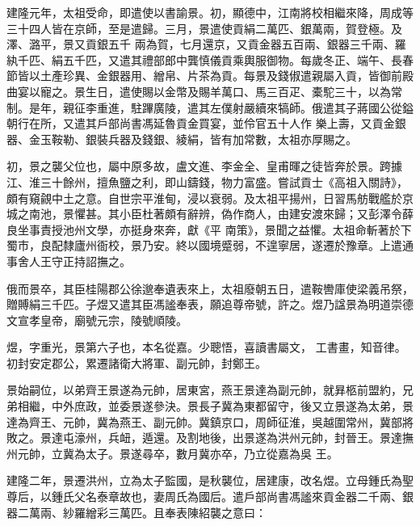 \begin{pinyinscope}
 建隆元年，太祖受命，即遣使以書諭景。初，顯德中，江南將校相繼來降，周成等三十四人皆在京師，至是遣歸。三月，景遣使貢絹二萬匹、銀萬兩，賀登極。及澤、潞平，景又貢銀五千
 兩為賀，七月還京，又貢金器五百兩、銀器三千兩、羅紈千匹、絹五千匹，又遣其禮部郎中龔慎儀貢乘輿服御物。每歲冬正、端午、長春節皆以土產珍異、金銀器用、繒帛、片茶為貢。每景及錢俶遣親屬入貢，皆御前殿曲宴以寵之。景生日，遣使賜以金幣及賜羊萬口、馬三百疋、橐駝三十，以為常制。是年，親征李重進，駐蹕廣陵，遣其左僕射嚴續來犒師。俄遣其子蔣國公從鎰朝行在所，又遣其戶部尚書馮延魯貢金買宴，並伶官五十人作
 樂上壽，又貢金銀器、金玉鞍勒、銀裝兵器及錢銀、綾絹，皆有加常數，太祖亦厚賜之。



 初，景之襲父位也，屬中原多故，盧文進、李金全、皇甫暉之徒皆奔於景。跨據江、淮三十餘州，擅魚鹽之利，即山鑄錢，物力富盛。嘗試貢士《高祖入關詩》，頗有窺覦中土之意。自世宗平淮甸，浸以衰弱。及太祖平揚州，日習馬舫戰艦於京城之南池，景懼甚。其小臣杜著頗有辭辨，偽作商人，由建安渡來歸；又彭澤令薛良坐事責授池州文學，亦挺身來奔，獻《平
 南策》，景聞之益懼。太祖命斬著於下蜀市，良配隸廬州衙校，景乃安。終以國境蹙弱，不遑寧居，遂遷於豫章。上遣通事舍人王守正持詔撫之。



 俄而景卒，其臣桂陽郡公徐邈奉遺表來上，太祖廢朝五日，遣鞍轡庫使梁義吊祭，贈賻絹三千匹。子煜又遣其臣馮謐奉表，願追尊帝號，許之。煜乃諡景為明道崇德文宣孝皇帝，廟號元宗，陵號順陵。



 煜，字重光，景第六子也，本名從嘉。少聰悟，喜讀書屬文，
 工書畫，知音律。初封安定郡公，累遷諸衛大將軍、副元帥，封鄭王。



 景始嗣位，以弟齊王景遂為元帥，居東宮，燕王景達為副元帥，就昪柩前盟約，兄弟相繼，中外庶政，並委景遂參決。景長子冀為東都留守，後又立景遂為太弟，景達為齊王、元帥，冀為燕王、副元帥。冀鎮京口，周師征淮，吳越圍常州，冀部將敗之。景達屯濠州，兵衄，遁還。及割地後，出景遂為洪州元帥，封晉王。景達撫州元帥，立冀為太子。景遂尋卒，數月冀亦卒，乃立從嘉為吳
 王。



 建隆二年，景遷洪州，立為太子監國，是秋襲位，居建康，改名煜。立母鍾氏為聖尊后，以鍾氏父名泰章故也，妻周氏為國后。遣戶部尚書馮謐來貢金器二千兩、銀器二萬兩、紗羅繒彩三萬匹。且奉表陳紹襲之意曰：




\end{pinyinscope}
